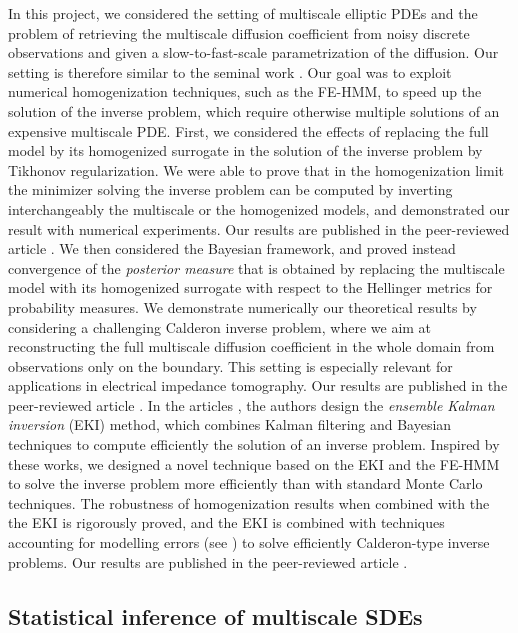 \documentclass[10pt]{article}
\begin{document}
In this project, we considered the setting of multiscale elliptic PDEs and the problem of retrieving the multiscale diffusion coefficient from noisy discrete observations and given a slow-to-fast-scale parametrization of the diffusion. Our setting is therefore similar to the seminal work \cite{NPS12}. Our goal was to exploit numerical homogenization techniques, such as the FE-HMM, to speed up the solution of the inverse problem, which require otherwise multiple solutions of an expensive multiscale PDE. First, we considered the effects of replacing the full model by its homogenized surrogate in the solution of the inverse problem by Tikhonov regularization. We were able to prove that in the homogenization limit the minimizer solving the inverse problem can be computed by inverting interchangeably the multiscale or the homogenized models, and demonstrated our result with numerical experiments. Our results are published in the peer-reviewed article \cite{AbD19}. We then considered the Bayesian framework, and proved instead convergence of the \textit{posterior measure} that is obtained by replacing the multiscale model with its homogenized surrogate with respect to the Hellinger metrics for probability measures. We demonstrate numerically our theoretical results by considering a challenging Calderon inverse problem, where we aim at reconstructing the full multiscale diffusion coefficient in the whole domain from observations only on the boundary. This setting is especially relevant for applications in electrical impedance tomography. Our results are published in the peer-reviewed article \cite{AbD20}. In the articles \cite{ILS13,ScS17}, the authors design the \textit{ensemble Kalman inversion} (EKI) method, which combines Kalman filtering and Bayesian techniques to compute efficiently the solution of an inverse problem. Inspired by these works, we designed a novel technique based on the EKI and the FE-HMM to solve the inverse problem more efficiently than with standard Monte Carlo techniques. The robustness of homogenization results when combined with the the EKI is rigorously proved, and the EKI is combined with techniques accounting for modelling errors (see \cite{CES14,CDS18}) to solve efficiently Calderon-type inverse problems. Our results are published in the peer-reviewed article \cite{AGZ20}.
 
\subsection{Statistical inference of multiscale SDEs}\label{sec:AndreaZ}
\end{document}
